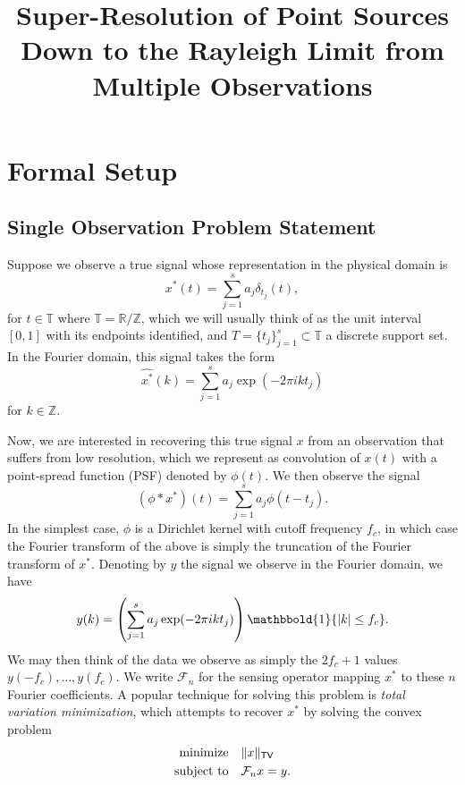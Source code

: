 \documentclass[11pt]{article}
\title{Super-Resolution of Point Sources Down to the Rayleigh Limit from Multiple Observations}
\author{}
\newcommand{\RR}{\mathbb{R}}
\newcommand{\TT}{\mathbb{T}}
\newcommand{\ZZ}{\mathbb{Z}}
\newcommand{\One}{\mathbbold{1}}
\newcommand{\sF}{\mathcal{F}}
\newcommand{\HS}{\hspace{3.5mm}}
\begin{document}
\maketitle

\noindent

\section{Formal Setup}

\subsection{Single Observation Problem Statement}

Suppose we observe a true signal whose representation in the physical domain is
\begin{equation}
    x^*(t) = \sum_{j = 1}^s a_j \delta_{t_j}(t),
\end{equation}
for $t \in \TT$ where $\TT = \RR / \ZZ$, which we will usually think of as the unit interval $[0, 1]$ with its endpoints identified, and $T = \{t_j\}_{j = 1}^s \subset \TT$ a discrete support set.
In the Fourier domain, this signal takes the form
\begin{equation}
    \widehat{x^*}(k) = \sum_{j = 1}^s a_j \exp(-2\pi i k t_j)
\end{equation}
for $k \in \ZZ$.

Now, we are interested in recovering this true signal $x$ from an observation that suffers from low resolution, which we represent as convolution of $x(t)$ with a point-spread function (PSF) denoted by $\phi(t)$.
We then observe the signal
\begin{equation}
    (\phi * x^*)(t) = \sum_{j = 1}^sa_j \phi(t - t_j).
\end{equation}
In the simplest case, $\phi$ is a Dirichlet kernel with cutoff frequency $f_c$, in which case the Fourier transform of the above is simply the truncation of the Fourier transform of $x^*$.
Denoting by $y$ the signal we observe in the Fourier domain, we have
\begin{equation}
    y(k) = \left(\sum_{j = 1}^s a_j \exp(-2\pi i k t_j)\right)\One\{|k| \leq f_c \}.
\end{equation}
We may then think of the data we observe as simply the $2f_c + 1$ values $y(-f_c), \dots, y(f_c)$.
We write $\sF_n$ for the sensing operator mapping $x^*$ to these $n$ Fourier coefficients.
A popular technique for solving this problem is \emph{total variation minimization}, which attempts to recover $x^*$ by solving the convex problem
\begin{equation}
\begin{aligned}
  \text{minimize} &\HS \|x\|_{\mathsf{TV}} \\
  \text{subject to} &\HS \sF_nx = y.
\end{aligned}
\end{equation}
\end{document}
